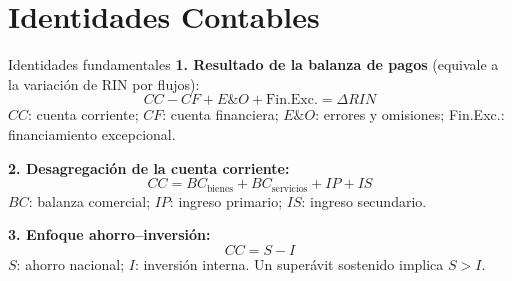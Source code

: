 \documentclass[10pt,aspectratio=169]{beamer}
\begin{document}
\section{Identidades Contables}
\begin{frame}{Identidades fundamentales}
  \textbf{1. Resultado de la balanza de pagos} (equivale a la variación de RIN por flujos):
  \begin{equation*}
    CC - CF + E\&O + \text{Fin.Exc.} = \Delta RIN
  \end{equation*}
  {\footnotesize $CC$: cuenta corriente; $CF$: cuenta financiera; $E\&O$: errores y omisiones; Fin.Exc.: financiamiento excepcional.}

  \vspace{0.6em}
  \textbf{2. Desagregación de la cuenta corriente:}
  \begin{equation*}
    CC = BC_{\text{bienes}} + BC_{\text{servicios}} + IP + IS
  \end{equation*}
  {\footnotesize $BC$: balanza comercial; $IP$: ingreso primario; $IS$: ingreso secundario.}

  \vspace{0.6em}
  \textbf{3. Enfoque ahorro--inversión:}
  \begin{equation*}
    CC = S - I
  \end{equation*}
  {\footnotesize $S$: ahorro nacional; $I$: inversión interna. Un superávit sostenido implica $S > I$.}
\end{frame}
\end{document}
